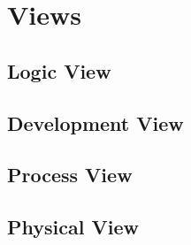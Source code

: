 \section{Views} 


\subsection{Logic View}


\subsection{Development View}


\subsection{Process View}


\subsection{Physical View}